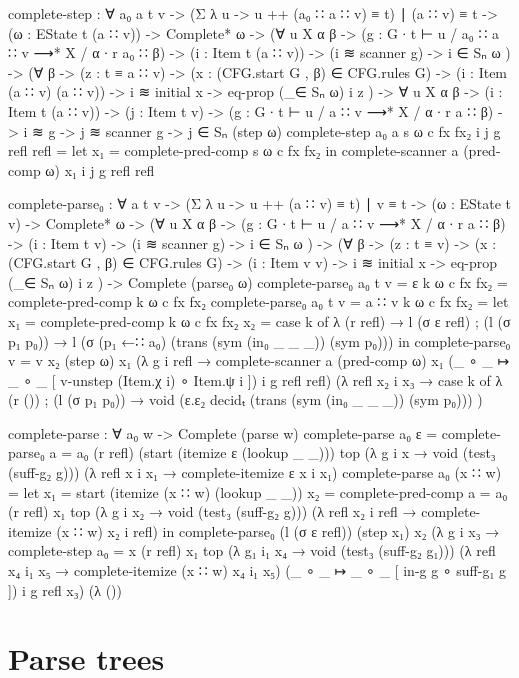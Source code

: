 		\begin{code}
			complete-step : ∀ {a₀ a t v} ->
			  (Σ λ u -> u ++ (a₀ ∷ a ∷ v) ≡ t) ∣ (a ∷ v) ≡ t ->
			  (ω : EState t (a ∷ v)) ->
			  Complete* ω ->
			  (∀ {u X α β} ->
			    (g : G ∙ t ⊢ u / a₀ ∷ a ∷ v ⟶* X / α ∙ r a₀ ∷ β) ->
			    (i : Item t (a ∷ v)) -> (i ≋ scanner g) ->
			    i ∈ Sₙ ω
			  ) ->
			  (∀ {β} ->
			    (z : t ≡ a ∷ v) ->
			    (x : (CFG.start G , β) ∈ CFG.rules G) ->
			    (i : Item (a ∷ v) (a ∷ v)) ->
			    i ≋ initial x -> eq-prop (_∈ Sₙ ω) i z
			  ) ->
			  ∀ {u X α β} ->
			  (i : Item t (a ∷ v)) ->
			  (j : Item t v) ->
			  (g : G ∙ t ⊢ u / a ∷ v ⟶* X / α ∙ r a ∷ β) ->
			  i ≋ g ->
			  j ≋ scanner g ->
			    j ∈ Sₙ (step ω)
			complete-step {a₀} {a} s ω c fx fx₂ i j g refl refl =
			  let
			    x₁ = complete-pred-comp s ω c fx fx₂
			  in complete-scanner a (pred-comp ω) x₁ i j g refl refl
		\end{code}

		\begin{code}
			complete-parse₀ : ∀ {a t v} ->
			  (Σ λ u -> u ++ (a ∷ v) ≡ t) ∣ v ≡ t ->
			  (ω : EState t v) ->
			  Complete* ω ->
			  (∀ {u X α β} ->
			    (g : G ∙ t ⊢ u / a ∷ v ⟶* X / α ∙ r a ∷ β) ->
			    (i : Item t v) -> (i ≋ scanner g) ->
			    i ∈ Sₙ ω
			  ) ->
			  (∀ {β} ->
			    (z : t ≡ v) ->
			    (x : (CFG.start G , β) ∈ CFG.rules G) ->
			    (i : Item v v) ->
			    i ≋ initial x -> eq-prop (_∈ Sₙ ω) i z
			  ) ->
			  Complete (parse₀ ω)
			complete-parse₀ {a₀} {t} {v = ε} k ω c fx fx₂ = complete-pred-comp k ω c fx fx₂
			complete-parse₀ {a₀} {t} {v = a ∷ v} k ω c fx fx₂ =
			  let
			    x₁ = complete-pred-comp k ω c fx fx₂
			    x₂ = case k of
			      λ { (r refl) → l (σ ε refl)
			        ; (l (σ p₁ p₀)) → l (σ (p₁ ←∷ a₀) (trans (sym (in₀ _ _ _)) (sym p₀)))
			        }
			  in
			  complete-parse₀ {v = v} x₂ (step ω) x₁
			    (λ {g i refl → complete-scanner a (pred-comp ω) x₁
			      (_ ∘ _ ↦ _ ∘ _ [ v-unstep (Item.χ i) ∘ Item.ψ i ]) i g refl refl})
			    (λ {refl x₂ i x₃ → case k of
			      λ { (r ())
			        ; (l (σ p₁ p₀)) → void (ε.ε₂ decidₜ (trans (sym (in₀ _ _ _)) (sym p₀)))
			        }
			      })
		\end{code}

		\begin{code}
			complete-parse : ∀ a₀ w ->
			  Complete (parse w)
			complete-parse a₀ ε =
			  complete-parse₀ {a = a₀} (r refl) (start (itemize ε (lookup _ _))) top
			    (λ {g i x → void (test₃ (suff-g₂ g))})
			    (λ {refl x i x₁ → complete-itemize ε x i x₁})
			complete-parse a₀ (x ∷ w) =
			  let
			    x₁ = start (itemize (x ∷ w) (lookup _ _))
			    x₂ = complete-pred-comp {a = a₀} (r refl) x₁ top
			      (λ {g i x₂ → void (test₃ (suff-g₂ g))})
			      (λ {refl x₂ i refl → complete-itemize (x ∷ w) x₂ i refl})
			  in
			  complete-parse₀ (l (σ ε refl)) (step x₁) x₂
			    (λ g i x₃ → complete-step {a₀ = x} (r refl) x₁ top
			      (λ {g₁ i₁ x₄ → void (test₃ (suff-g₂ g₁))})
			      (λ {refl x₄ i₁ x₅ → complete-itemize (x ∷ w) x₄ i₁ x₅})
			      (_ ∘ _ ↦ _ ∘ _ [ in-g g ∘ suff-g₁ g ]) i g refl x₃)
			    (λ ())
		\end{code}

	\section{Parse trees}


